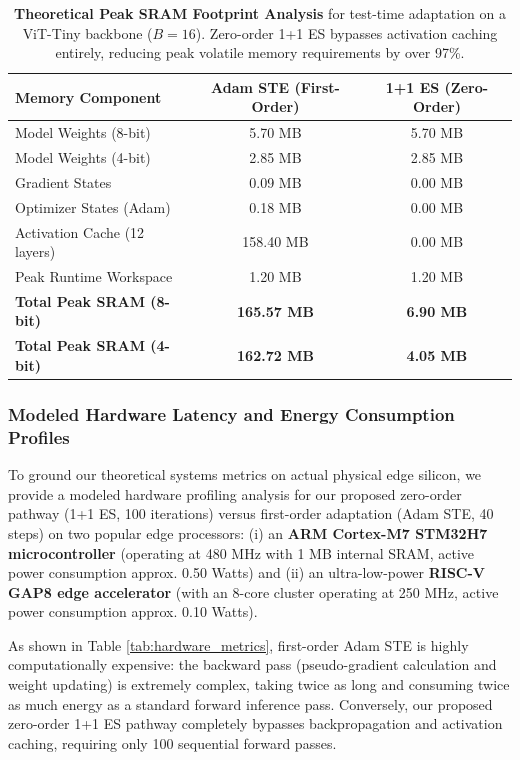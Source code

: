 \begin{table}[h]
\centering
\caption{\textbf{Theoretical Peak SRAM Footprint Analysis} for test-time adaptation on a ViT-Tiny backbone ($B=16$). Zero-order 1+1 ES bypasses activation caching entirely, reducing peak volatile memory requirements by over 97\%.}
\label{tab:sram_footprint}
\vskip 0.15in
\begin{small}
\begin{sc}
\begin{tabular}{lcc}
\toprule
Memory Component & Adam STE (First-Order) & 1+1 ES (Zero-Order) \\
\midrule
Model Weights (8-bit) & 5.70 MB & 5.70 MB \\
Model Weights (4-bit) & 2.85 MB & 2.85 MB \\
Gradient States & 0.09 MB & 0.00 MB \\
Optimizer States (Adam) & 0.18 MB & 0.00 MB \\
Activation Cache (12 layers) & 158.40 MB & 0.00 MB \\
Peak Runtime Workspace & 1.20 MB & 1.20 MB \\
\midrule
\textbf{Total Peak SRAM (8-bit)} & \textbf{165.57 MB} & \textbf{6.90 MB} \\
\textbf{Total Peak SRAM (4-bit)} & \textbf{162.72 MB} & \textbf{4.05 MB} \\
\bottomrule
\end{tabular}
\end{sc}
\end{small}
\end{table}

\subsubsection{Modeled Hardware Latency and Energy Consumption Profiles}
To ground our theoretical systems metrics on actual physical edge silicon, we provide a modeled hardware profiling analysis for our proposed zero-order pathway (1+1 ES, 100 iterations) versus first-order adaptation (Adam STE, 40 steps) on two popular edge processors: (i) an \textbf{ARM Cortex-M7 STM32H7 microcontroller} (operating at 480 MHz with 1 MB internal SRAM, active power consumption approx. 0.50 Watts) and (ii) an ultra-low-power \textbf{RISC-V GAP8 edge accelerator} (with an 8-core cluster operating at 250 MHz, active power consumption approx. 0.10 Watts). 

As shown in Table \ref{tab:hardware_metrics}, first-order Adam STE is highly computationally expensive: the backward pass (pseudo-gradient calculation and weight updating) is extremely complex, taking twice as long and consuming twice as much energy as a standard forward inference pass. Conversely, our proposed zero-order 1+1 ES pathway completely bypasses backpropagation and activation caching, requiring only 100 sequential forward passes. 


